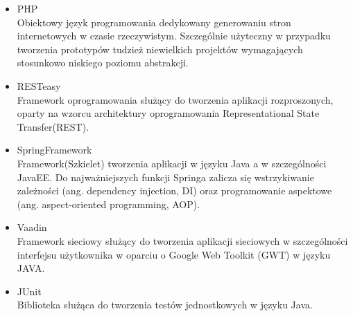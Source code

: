 \documentclass[11pt,a4paper,polish,thesis]{dcsbook}
\begin{document}
\begin{itemize}
\item{PHP} \\
Obiektowy język programowania dedykowany generowaniu stron internetowych w czasie rzeczywistym. Szczególnie użyteczny w przypadku tworzenia prototypów tudzież niewielkich projektów wymagających stosunkowo niskiego poziomu abstrakcji.
\item{RESTeasy} \\
Framework oprogramowania służący do tworzenia aplikacji rozproszonych, oparty na wzorcu architektury oprogramowania Representational State Transfer(REST).
\item{SpringFramework} \\
Framework(Szkielet) tworzenia aplikacji w języku Java a w szczególności JavaEE. Do najważniejszych funkcji Springa zalicza się wstrzykiwanie zależności (ang. dependency injection, DI) oraz programowanie aspektowe (ang. aspect-oriented programming, AOP).  
\item{Vaadin} \\
Framework sieciowy służący do tworzenia aplikacji sieciowych w szczególności interfejsu użytkownika w oparciu o Google Web Toolkit (GWT) w języku JAVA.
\item{JUnit} \\
Biblioteka służąca do tworzenia testów jednostkowych w języku Java.
\end{itemize}
\end{document}
